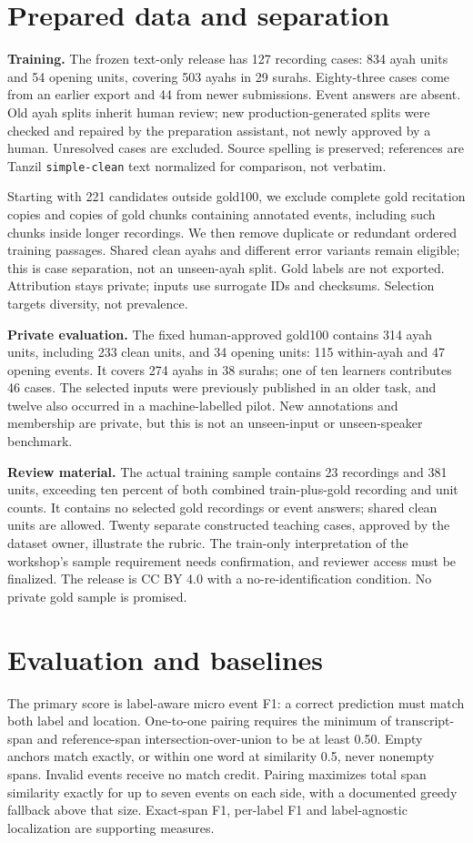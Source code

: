 \documentclass{article}
\begin{document}
\section{Prepared data and separation}
\textbf{Training.} The frozen text-only release has 127 recording cases: 834 ayah units and 54 opening units, covering 503 ayahs in 29 surahs. Eighty-three cases come from an earlier export and 44 from newer submissions. Event answers are absent. Old ayah splits inherit human review; new production-generated splits were checked and repaired by the preparation assistant, not newly approved by a human. Unresolved cases are excluded. Source spelling is preserved; references are Tanzil \texttt{simple-clean} text normalized for comparison, not verbatim.

Starting with 221 candidates outside gold100, we exclude complete gold recitation copies and copies of gold chunks containing annotated events, including such chunks inside longer recordings. We then remove duplicate or redundant ordered training passages. Shared clean ayahs and different error variants remain eligible; this is case separation, not an unseen-ayah split. Gold labels are not exported. Attribution stays private; inputs use surrogate IDs and checksums. Selection targets diversity, not prevalence.

\textbf{Private evaluation.} The fixed human-approved gold100 contains 314 ayah units, including 233 clean units, and 34 opening units: 115 within-ayah and 47 opening events. It covers 274 ayahs in 38 surahs; one of ten learners contributes 46 cases. The selected inputs were previously published in an older task, and twelve also occurred in a machine-labelled pilot. New annotations and membership are private, but this is not an unseen-input or unseen-speaker benchmark.

\textbf{Review material.} The actual training sample contains 23 recordings and 381 units, exceeding ten percent of both combined train-plus-gold recording and unit counts. It contains no selected gold recordings or event answers; shared clean units are allowed. Twenty separate constructed teaching cases, approved by the dataset owner, illustrate the rubric. The train-only interpretation of the workshop's sample requirement needs confirmation, and reviewer access must be finalized. The release is CC BY 4.0 with a no-re-identification condition. No private gold sample is promised.

\section{Evaluation and baselines}
The primary score is label-aware micro event F1: a correct prediction must match both label and location. One-to-one pairing requires the minimum of transcript-span and reference-span intersection-over-union to be at least 0.50. Empty anchors match exactly, or within one word at similarity 0.5, never nonempty spans. Invalid events receive no match credit. Pairing maximizes total span similarity exactly for up to seven events on each side, with a documented greedy fallback above that size. Exact-span F1, per-label F1 and label-agnostic localization are supporting measures.
\end{document}
